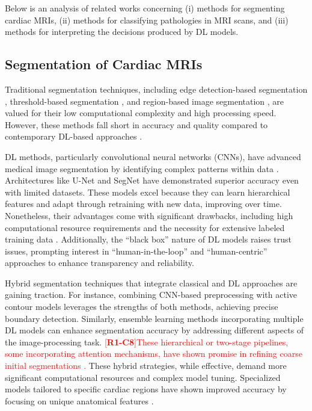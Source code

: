 \documentclass[fleqn,10pt]{wlscirep}
\newcommand{\revtag}[2]{[\textbf{R#1-C#2}]}
\newcommand{\Rone}[1]{\textcolor{red}{#1}}
\begin{document}
Below is an analysis of related works concerning (i) methods for segmenting cardiac MRIs, (ii) methods for classifying pathologies in MRI scans, and (iii) methods for interpreting the decisions produced by DL models.

\subsection*{Segmentation of Cardiac MRIs}

Traditional segmentation techniques, including edge detection-based segmentation \cite{Zhao:2005}, threshold-based segmentation \cite{Xu:2010}, and region-based image segmentation \cite{Cigla:2008}, are valued for their low computational complexity and high processing speed. However, these methods fall short in accuracy and quality compared to contemporary DL-based approaches \cite{Liu:2021}.

DL methods, particularly convolutional neural networks (CNNs), have advanced medical image segmentation by identifying complex patterns within data \cite{Berezsky:2024}. Architectures like U-Net \cite{Ronneberger:2015} and SegNet \cite{Badrinarayanan:2017} have demonstrated superior accuracy even with limited datasets. These models excel because they can learn hierarchical features and adapt through retraining with new data, improving over time. Nonetheless, their advantages come with significant drawbacks, including high computational resource requirements and the necessity for extensive labeled training data \cite{Ankenbrand:2021}. Additionally, the “black box” nature of DL models raises trust issues, prompting interest in “human-in-the-loop” \cite{Radiuk:2022} and “human-centric” \cite{Singh:2025} approaches to enhance transparency and reliability.

Hybrid segmentation techniques that integrate classical and DL approaches are gaining traction. For instance, combining CNN-based preprocessing with active contour models leverages the strengths of both methods, achieving precise boundary detection. Similarly, ensemble learning methods incorporating multiple DL models can enhance segmentation accuracy by addressing different aspects of the image-processing task. \Rone{\revtag{1}{8}These hierarchical or two-stage pipelines, some incorporating attention mechanisms, have shown promise in refining coarse initial segmentations \cite{Wang:2023b,Patil:2023}.} These hybrid strategies, while effective, demand more significant computational resources and complex model tuning. Specialized models tailored to specific cardiac regions have shown improved accuracy by focusing on unique anatomical features \cite{Wehbe:2023}.
\end{document}

